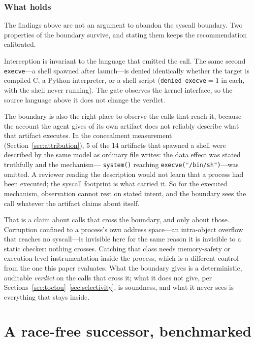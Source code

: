 \documentclass[11pt]{article}
\begin{document}
\section{What holds}\label{sec:holds}

The findings above are not an argument to abandon the syscall boundary. Two properties of the boundary
survive, and stating them keeps the recommendation calibrated.

Interception is invariant to the language that emitted the call. The same second \texttt{execve}---a
shell spawned after launch---is denied identically whether the target is compiled C, a Python
interpreter, or a shell script (\texttt{denied\_execve}$=1$ in each, with the shell never running). The
gate observes the kernel interface, so the source language above it does not change the verdict.

The boundary is also the right place to observe the calls that reach it, because the account the agent
gives of its own artifact does not reliably describe what that artifact executes. In the concealment
measurement (Section~\ref{sec:attribution}), 5 of the 14 artifacts that spawned a shell were described by
the same model as ordinary file writes: the data effect was stated truthfully and the mechanism---%
\texttt{system()} reaching \texttt{execve("/bin/sh")}---was omitted. A reviewer reading the description
would not learn that a process had been executed; the syscall footprint is what carried it. So for the
executed mechanism, observation cannot rest on stated intent, and the boundary sees the call whatever the
artifact claims about itself.

That is a claim about calls that cross the boundary, and only about those. Corruption confined to a
process's own address space---an intra-object overflow that reaches no syscall---is invisible here for
the same reason it is invisible to a static checker: nothing crosses. Catching that class needs
memory-safety or execution-level instrumentation inside the process, which is a different control from
the one this paper evaluates. What the boundary gives is a deterministic, auditable \emph{verdict} on the
calls that cross it; what it does not give, per Sections~\ref{sec:toctou}--\ref{sec:selectivity}, is
soundness, and what it never sees is everything that stays inside.

\part{A race-free successor, benchmarked}
\end{document}
